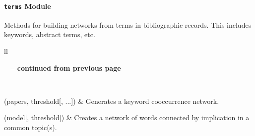 \documentclass[letterpaper,10pt,english]{sphinxmanual}
\begin{document}
\paragraph{\texttt{terms} Module}
\label{tethne.networks:module-tethne.networks.terms}\label{tethne.networks:terms-module}
Methods for building networks from terms in bibliographic records. This
includes keywords, abstract terms, etc.

\begin{longtable}{ll}
\hline
\endfirsthead

%
{{\bfseries \tablename\ \thetable{} -- continued from previous page}} \\
\hline
\endhead

\hline {} \\ \hline
\endfoot

\hline
\endlastfoot


{\hyperref[tethne.networks:tethne.networks.terms.keyword_cooccurrence]{}}(papers, threshold{[}, ...{]})
 & 
Generates a keyword cooccurrence network.
\\\hline

{\hyperref[tethne.networks:tethne.networks.terms.topic_coupling]{}}(model{[}, threshold{]})
 & 
Creates a network of words connected by implication in a common topic(s).
\\\hline
\end{longtable}

\end{document}
